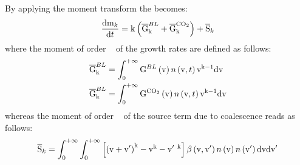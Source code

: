 %
\par
%
By applying the moment transform the {\PopulationBalanceEquation} becomes:
\begin{equation}
    \frac{\mathrm{d}\mathrm{m}_{k}}{\mathrm{d}t} = \mathrm{k} \left(  \overline{\mathrm{G}}_{\mathrm{k}}^{BL} + \overline{\mathrm{G}}_{\mathrm{k}}^{\mathrm{C}\mathrm{O}_2} \right) +  \overline{\mathrm{S}}_k
\end{equation}
where the moment of order {~\GenericOrder} of the growth rates are defined as follows:
\begin{align}
    \overline{\mathrm{G}}_{\mathrm{k}}^{BL} &= 
                                     \int_{0}^{+\infty}
                                                       {\mathrm{G}^{BL}}\left( \mathrm{v} \right)
                                                       n\left({\mathrm{v}, t}\right)
                                                       \mathrm{v}^{\mathrm{k}-1}                                     
                                     \mathrm{d}\mathrm{v} \\
    \overline{\mathrm{G}}_{\mathrm{k}}^{BL} &= 
                                     \int_{0}^{+\infty}
                                                        {\mathrm{G}^{\mathrm{C}\mathrm{O}_2}}\left( \mathrm{v} \right)
                                                        n\left({\mathrm{v}, t}\right)
                                                        \mathrm{v}^{\mathrm{k}-1}
                                     \mathrm{d}\mathrm{v}
\end{align}
whereas the moment of order {~\GenericOrder} of the source term due to coalescence reads as follows:
\begin{equation}
    \overline{\mathrm{S}}_k =
        \int_{0}^{+\infty}
                        \int_{0}^{+\infty}
                                        \left[
                                            \left(
                                                \mathrm{v} + \mathrm{v}'
                                            \right)^{\mathrm{k}} - \mathrm{v}^{\mathrm{k}} - \mathrm{v}'\ ^{\mathrm{k}}
                                        \right]
                                        {\ensuremath{\beta}}\left( \mathrm{v},\mathrm{v}' \right)
                                        n\left({\mathrm{v}}\right)
                                        n\left({\mathrm{v}'}\right)
                                       \mathrm{d}\mathrm{v}
                       \mathrm{d}\mathrm{v}'
\end{equation}
